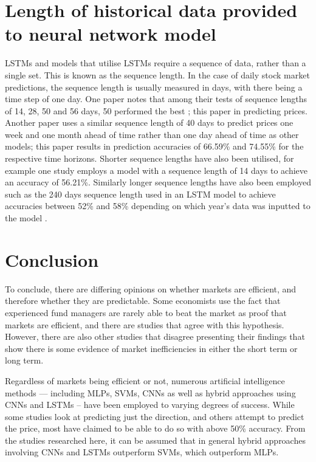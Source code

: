 \section{Length of historical data provided to neural network model}

LSTMs and models that utilise LSTMs require a sequence of data, rather than a single set. This is known as the sequence length.
In the case of daily stock market predictions, the sequence length is usually measured in days, with there being a time step of one day.
One paper notes that among their tests of sequence lengths of 14, 28, 50 and 56 days, 50 performed the best \parencite{noveldeepcnnbilstm};
this paper in predicting prices.
Another paper uses a similar sequence length of 40 days to predict prices one week and one month ahead of time \parencite{hao_gao_2020} rather than one
day ahead of time as other models; this paper results in prediction accuracies of 66.59\% and 74.55\% for the respective time horizons.
Shorter sequence lengths have also been utilised, for example one study employs a model with a sequence length of 14 days to achieve an
accuracy of 56.21\%. Similarly longer sequence lengths have also been employed such as the 240 days sequence length used in an LSTM model to achieve
accuracies between 52\% and 58\% depending on which year's data was inputted to the model \parencite{fischer_krauss_2018}. 

\section{Conclusion}
To conclude, there are differing opinions on whether markets are efficient, and therefore whether they are predictable. Some economists use the fact that experienced fund managers are rarely able to beat the market as proof that markets are efficient, and there are studies that agree with this hypothesis. However, there are also other studies that disagree presenting their findings that show there is some evidence of market inefficiencies in either the short term or long term.

Regardless of markets being efficient or not, numerous artificial intelligence methods — including MLPs, SVMs, CNNs as well as hybrid approaches using CNNs and LSTMs -- have been employed to varying degrees of success. While some studies look at predicting just the direction, and others attempt to predict the price, most have claimed to be able to do so with above 50\% accuracy. From the studies researched here, it can be assumed that in general hybrid approaches involving CNNs and LSTMs outperform SVMs, which outperform MLPs.

